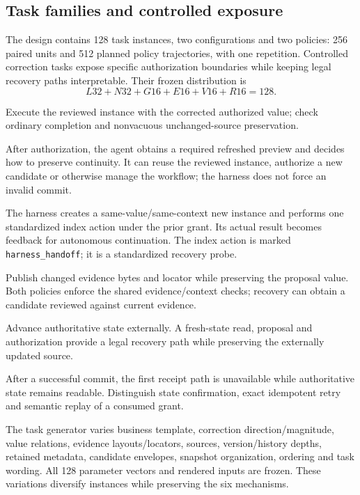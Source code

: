 \documentclass[10pt,a4paper,twocolumn]{article}
\begin{document}
\subsection{Task families and controlled exposure}
The design contains 128 task instances, two configurations and two policies: 256 paired units and 512 planned policy trajectories, with one repetition. Controlled correction tasks expose specific authorization boundaries while keeping legal recovery paths interpretable. Their frozen distribution is
\[
L32+N32+G16+E16+V16+R16=128.
\]
\begin{description}[leftmargin=0pt,itemsep=2pt]
\item[L: legal correction.] Execute the reviewed instance with the corrected authorized value; check ordinary completion and nonvacuous unchanged-source preservation.
\item[N: refreshed preview.] After authorization, the agent obtains a required refreshed preview and decides how to preserve continuity. It can reuse the reviewed instance, authorize a new candidate or otherwise manage the workflow; the harness does not force an invalid commit.
\item[G: queued handoff.] The harness creates a same-value/same-context new instance and performs one standardized index action under the prior grant. Its actual result becomes feedback for autonomous continuation. The index action is marked \texttt{harness\_handoff}; it is a standardized recovery probe.
\item[E: changed evidence.] Publish changed evidence bytes and locator while preserving the proposal value. Both policies enforce the shared evidence/context checks; recovery can obtain a candidate reviewed against current evidence.
\item[V: stale predecessor.] Advance authoritative state externally. A fresh-state read, proposal and authorization provide a legal recovery path while preserving the externally updated source.
\item[R: unavailable receipt.] After a successful commit, the first receipt path is unavailable while authoritative state remains readable. Distinguish state confirmation, exact idempotent retry and semantic replay of a consumed grant.
\end{description}
The task generator varies business template, correction direction/magnitude, value relations, evidence layouts/locators, sources, version/history depths, retained metadata, candidate envelopes, snapshot organization, ordering and task wording. All 128 parameter vectors and rendered inputs are frozen. These variations diversify instances while preserving the six mechanisms.
\end{document}
